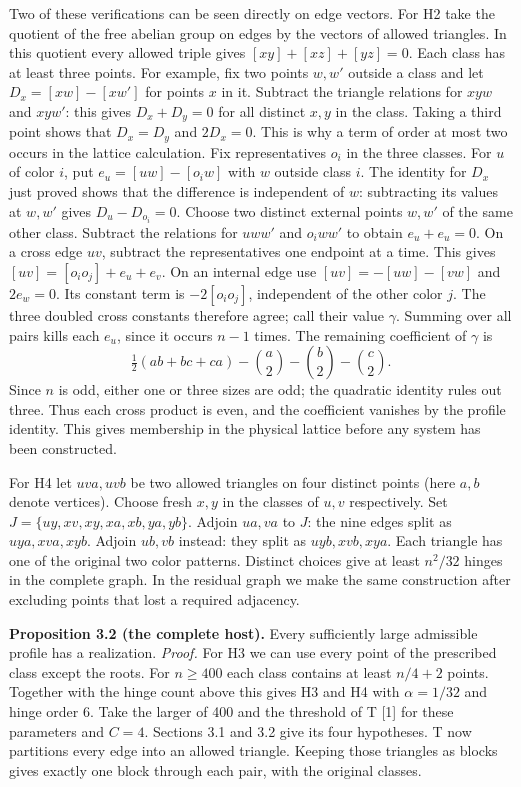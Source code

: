 \documentclass[english,11pt,a4paper]{article}
\begin{document}
Two of these verifications can be seen directly on edge vectors. For H2 take the quotient of the free abelian group on edges by the vectors of allowed triangles. In this quotient every allowed triple gives \([xy]+[xz]+[yz]=0\). Each class has at least three points. For example, fix two points \(w,w'\) outside a class and let \(D_x=[xw]-[xw']\) for points \(x\) in it. Subtract the triangle relations for \(xyw\) and \(xyw'\): this gives \(D_x+D_y=0\) for all distinct \(x,y\) in the class. Taking a third point shows that \(D_x=D_y\) and \(2D_x=0\). This is why a term of order at most two occurs in the lattice calculation. Fix representatives \(o_i\) in the three classes. For \(u\) of color \(i\), put \(e_u=[uw]-[o_iw]\) with \(w\) outside class \(i\). The identity for \(D_x\) just proved shows that the difference is independent of \(w\): subtracting its values at \(w,w'\) gives \(D_u-D_{o_i}=0\). Choose two distinct external points \(w,w'\) of the same other class. Subtract the relations for \(uww'\) and \(o_iww'\) to obtain \(e_u+e_u=0\). On a cross edge \(uv\), subtract the representatives one endpoint at a time. This gives \([uv]=[o_io_j]+e_u+e_v\). On an internal edge use \([uv]=-[uw]-[vw]\) and \(2e_w=0\). Its constant term is \(-2[o_io_j]\), independent of the other color \(j\). The three doubled cross constants therefore agree; call their value \(\gamma\). Summing over all pairs kills each \(e_u\), since it occurs \(n-1\) times. The remaining coefficient of \(\gamma\) is \[\tfrac12(ab+bc+ca)-\binom a2-\binom b2-\binom c2.\] Since \(n\) is odd, either one or three sizes are odd; the quadratic identity rules out three. Thus each cross product is even, and the coefficient vanishes by the profile identity. This gives membership in the physical lattice before any system has been constructed.

For H4 let \(uva,uvb\) be two allowed triangles on four distinct points (here \(a,b\) denote vertices). Choose fresh \(x,y\) in the classes of \(u,v\) respectively. Set \(J=\{uy,xv,xy,xa,xb,ya,yb\}\). Adjoin \(ua,va\) to \(J\): the nine edges split as \(uya,xva,xyb\). Adjoin \(ub,vb\) instead: they split as \(uyb,xvb,xya\). Each triangle has one of the original two color patterns. Distinct choices give at least \(n^2/32\) hinges in the complete graph. In the residual graph we make the same construction after excluding points that lost a required adjacency.

\textbf{Proposition 3.2 (the complete host).} Every sufficiently large admissible profile has a realization. \emph{Proof.} For H3 we can use every point of the prescribed class except the roots. For \(n\ge400\) each class contains at least \(n/4+2\) points. Together with the hinge count above this gives H3 and H4 with \(\alpha=1/32\) and hinge order 6. Take the larger of 400 and the threshold of T {[}1{]} for these parameters and \(C=4\). Sections 3.1 and 3.2 give its four hypotheses. T now partitions every edge into an allowed triangle. Keeping those triangles as blocks gives exactly one block through each pair, with the original classes.
\end{document}
